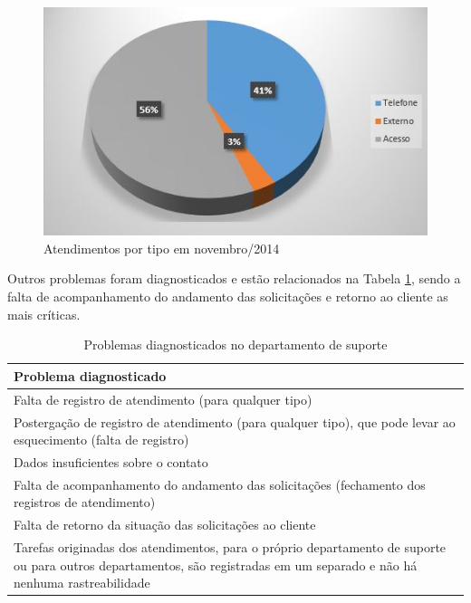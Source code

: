\begin{figure}[!h]
\centering
\includegraphics[scale=0.5]{figuras/atendimentos_por_tipo.jpg}
\caption{Atendimentos por tipo em novembro/2014}
\label{Fig:atend11}
\end{figure}

Outros problemas foram diagnosticados e estão relacionados na Tabela \ref{Tab:probl:atend}, sendo a falta de acompanhamento do andamento das solicitações e retorno ao cliente as mais críticas.

\begin{table}[h!]\footnotesize
\centering
\begin{tabular}
{
 	|p{14cm}|
}

	\hline
	\textbf{Problema diagnosticado}\\
	\hline

	Falta de registro de atendimento (para qualquer tipo)\\
	\hline

	Postergação de registro de atendimento (para qualquer tipo), que pode levar ao esquecimento (falta de registro)\\
	\hline
	
	Dados insuficientes sobre o contato\\
	\hline
	
	 Falta de acompanhamento do andamento das solicitações (fechamento dos registros de atendimento)\\
	\hline

	 Falta de retorno da situação das solicitações ao cliente\\
	\hline

	Tarefas originadas dos atendimentos, para o próprio departamento de suporte ou para outros departamentos, são registradas em um \sw separado e não há nenhuma rastreabilidade\\
	\hline

\end{tabular}
\caption {Problemas diagnosticados no departamento de suporte}
\label{Tab:probl:atend}
\end{table}


